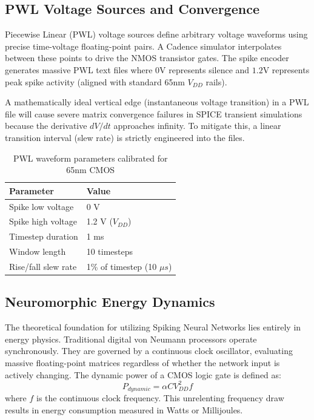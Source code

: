 \documentclass{ieeeaccess}
\begin{document}
\subsection{PWL Voltage Sources and Convergence}

Piecewise Linear (PWL) voltage sources define arbitrary voltage waveforms using precise time-voltage floating-point pairs. A Cadence simulator interpolates between these points to drive the NMOS transistor gates. The spike encoder generates massive PWL text files where $0\text{V}$ represents silence and $1.2\text{V}$ represents peak spike activity (aligned with standard 65nm $V_{DD}$ rails). 

A mathematically ideal vertical edge (instantaneous voltage transition) in a PWL file will cause severe matrix convergence failures in SPICE transient simulations because the derivative $dV/dt$ approaches infinity. To mitigate this, a linear transition interval (slew rate) is strictly engineered into the files.

\begin{table}[H]
\centering
\caption{PWL waveform parameters calibrated for 65nm CMOS}
\label{tab:pwlparams}
\begin{tabular}{|p{}|p{}|}
\hline
\textbf{Parameter} & \textbf{Value} \\
\hline
Spike low voltage & 0 V \\
\hline
Spike high voltage & 1.2 V ($V_{DD}$) \\
\hline
Timestep duration & 1 ms \\
\hline
Window length & 10 timesteps \\
\hline
Rise/fall slew rate & 1\% of timestep (10 $\mu s$) \\
\hline
\end{tabular}
\end{table}

\subsection{Neuromorphic Energy Dynamics}

The theoretical foundation for utilizing Spiking Neural Networks lies entirely in energy physics. Traditional digital von Neumann processors operate synchronously. They are governed by a continuous clock oscillator, evaluating massive floating-point matrices regardless of whether the network input is actively changing. The dynamic power of a CMOS logic gate is defined as:
\begin{equation}
P_{dynamic} = \alpha C V_{DD}^2 f
\end{equation}
where $f$ is the continuous clock frequency. This unrelenting frequency draw results in energy consumption measured in Watts or Millijoules.
\end{document}
